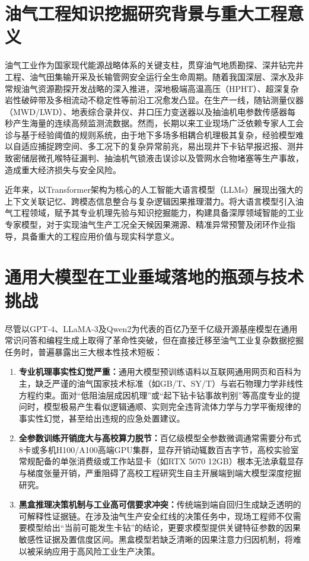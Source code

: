 \documentclass[UTF8,a4paper,zihao=-4,openany,twoside]{ctexbook}
\begin{document}
\section{油气工程知识挖掘研究背景与重大工程意义}
油气工业作为国家现代能源战略体系的关键支柱，贯穿油气地质勘探、深井钻完井工程、油气田集输开采及长输管网安全运行全生命周期。随着我国深层、深水及非常规油气资源勘探开发战略的深入推进，深地极端高温高压（HPHT）、超深复杂岩性破碎带及多相流动不稳定性等前沿工况愈发凸显。在生产一线，随钻测量仪器（MWD/LWD）、地表综合录井仪、井口压力变送器以及抽油机电参数传感器每秒产生海量的连续高频监测流数据。然而，长期以来工业现场广泛依赖专家人工会诊与基于经验阈值的规则系统，由于地下多场多相耦合机理极其复杂，经验模型难以自适应捕捉跨空间、多工况下的复杂异常前兆，易出现井下卡钻早报迟报、测井致密储层微孔喉特征漏判、抽油机气锁液击误诊以及管网水合物堵塞等生产事故，造成重大经济损失与安全风险\cite{zhao2023survey}。

近年来，以Transformer架构为核心的人工智能大语言模型（LLMs）展现出强大的上下文关联记忆、跨模态信息整合与复杂逻辑因果推理潜力\cite{vaswani2017attention, brown2020language}。将大语言模型引入油气工程领域，赋予其专业机理先验与知识挖掘能力，构建具备深厚领域智能的工业专家模型，对于实现油气生产工况全天候因果溯源、精准异常预警及闭环作业指导，具备重大的工程应用价值与现实科学意义。

\section{通用大模型在工业垂域落地的瓶颈与技术挑战}
尽管以GPT-4、LLaMA-3及Qwen2为代表的百亿乃至千亿级开源基座模型在通用常识问答和编程生成上取得了革命性突破\cite{touvron2023llama, yang2024qwen2}，但在直接迁移至油气工业复杂数据挖掘任务时，普遍暴露出三大根本性技术短板：
\begin{enumerate}
    \item \textbf{专业机理事实性幻觉严重：}通用大模型预训练语料以互联网通用网页和百科为主，缺乏严谨的油气国家技术标准（如GB/T、SY/T）与岩石物理力学非线性方程约束。面对“低阻油层成因机理”或“起下钻卡钻事故判别”等高度专业的提问时，模型极易产生看似逻辑通顺、实则完全违背流体力学与力学平衡规律的事实性幻觉，甚至给出违规的应急处置建议\cite{ouyang2022training}。
    \item \textbf{全参数训练开销庞大与高校算力脱节：}百亿级模型全参数微调通常需要分布式8卡或多机H100/A100高端GPU集群，显存开销动辄数百吉字节，高校实验室常规配备的单张消费级或工作站显卡（如RTX 5070 12GB）根本无法承载显存与梯度张量开销，严重阻碍了高校工程研究生自主开展端到端大模型深度挖掘研究\cite{hu2021lora}。
    \item \textbf{黑盒推理决策机制与工业高可信要求冲突：}传统端到端自回归生成缺乏透明的可解释性证据链。在涉及油气生产安全红线的决策任务中，现场工程师不仅需要模型给出“当前可能发生卡钻”的结论，更要求模型提供关键特征参数的因果敏感性证据及置信度区间。黑盒模型若缺乏清晰的因果注意力归因机制，将难以被采纳应用于高风险工业生产决策\cite{cui2023ultrafeedback}。
\end{enumerate}
\end{document}
